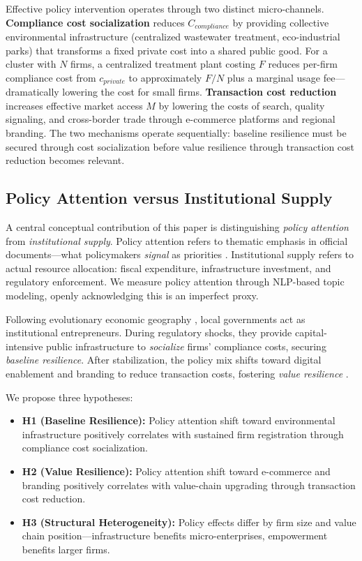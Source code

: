 \documentclass[a4paper, twoside, final]{article}
\begin{document}
Effective policy intervention operates through two distinct micro-channels. \textbf{Compliance cost socialization} reduces $C_{compliance}$ by providing collective environmental infrastructure (centralized wastewater treatment, eco-industrial parks) that transforms a fixed private cost into a shared public good. For a cluster with $N$ firms, a centralized treatment plant costing $F$ reduces per-firm compliance cost from $c_{private}$ to approximately $F/N$ plus a marginal usage fee---dramatically lowering the cost for small firms. \textbf{Transaction cost reduction} increases effective market access $M$ by lowering the costs of search, quality signaling, and cross-border trade through e-commerce platforms and regional branding. The two mechanisms operate sequentially: baseline resilience must be secured through cost socialization before value resilience through transaction cost reduction becomes relevant.

\subsection{Policy Attention versus Institutional Supply}
A central conceptual contribution of this paper is distinguishing \emph{policy attention} from \emph{institutional supply}. Policy attention refers to thematic emphasis in official documents---what policymakers \emph{signal} as priorities \citep{Flanagan2011}. Institutional supply refers to actual resource allocation: fiscal expenditure, infrastructure investment, and regulatory enforcement. We measure policy attention through NLP-based topic modeling, openly acknowledging this is an imperfect proxy.

Following evolutionary economic geography \citep{Sotarauta2017}, local governments act as institutional entrepreneurs. During regulatory shocks, they provide capital-intensive public infrastructure to \emph{socialize} firms' compliance costs, securing \emph{baseline resilience}. After stabilization, the policy mix shifts toward digital enablement and branding to reduce transaction costs, fostering \emph{value resilience} \citep{Tian2023}.

We propose three hypotheses:
\begin{itemize}
  \item \textbf{H1 (Baseline Resilience):} Policy attention shift toward environmental infrastructure positively correlates with sustained firm registration through compliance cost socialization.
  \item \textbf{H2 (Value Resilience):} Policy attention shift toward e-commerce and branding positively correlates with value-chain upgrading through transaction cost reduction.
  \item \textbf{H3 (Structural Heterogeneity):} Policy effects differ by firm size and value chain position---infrastructure benefits micro-enterprises, empowerment benefits larger firms.
\end{itemize}
\end{document}
